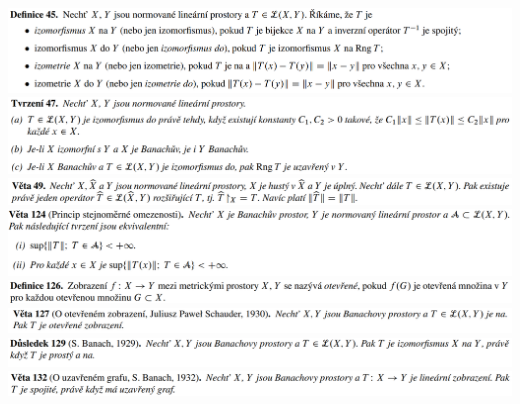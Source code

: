 \documentclass[12pt,a4paper]{article}
\begin{document}
\begin{center}
		\includegraphics[width=\textwidth]{img/2banHilb/2020-06-20 17 21 41.png}\vspace{0.3cm}
		\includegraphics[width=\textwidth]{img/2banHilb/2020-06-20 17 22 00.png}\vspace{0.3cm}
		\includegraphics[width=\textwidth]{img/2banHilb/2020-06-20 17 22 08.png}\vspace{0.3cm}
		\includegraphics[width=\textwidth]{img/2banHilb/2020-06-20 17 29 56.png}\vspace{0.3cm}
		\includegraphics[width=\textwidth]{img/2banHilb/2020-06-20 17 30 11.png}\vspace{0.3cm}
		\includegraphics[width=\textwidth]{img/2banHilb/2020-06-20 17 30 19.png}\vspace{0.3cm}
		\includegraphics[width=\textwidth]{img/2banHilb/2020-06-20 17 30 34.png}\vspace{0.3cm}
		\includegraphics[width=\textwidth]{img/2banHilb/2020-06-20 17 30 49.png}\vspace{0.3cm}
	\end{center}
\end{document}

